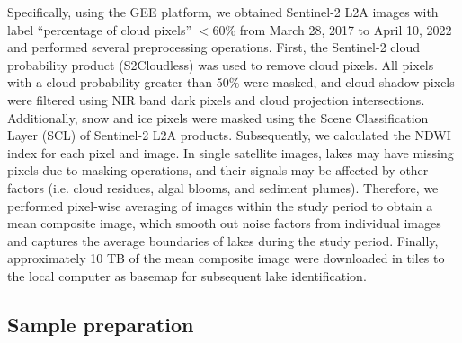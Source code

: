 \documentclass[preprint,12pt,authoryear]{elsarticle}
\begin{document}
Specifically, using the GEE platform, we obtained Sentinel-2 L2A images with label “percentage of cloud pixels” $\lt$60\% from March 28, 2017 to April 10, 2022 and performed several preprocessing operations. First, the Sentinel-2 cloud probability product (S2Cloudless) was used to remove cloud pixels. All pixels with a cloud probability greater than 50\% were masked, and cloud shadow pixels were filtered using NIR band dark pixels and cloud projection intersections. Additionally, snow and ice pixels were masked using the Scene Classification Layer (SCL) of Sentinel-2 L2A products. Subsequently, we calculated the NDWI index for each pixel and image. In single satellite images, lakes may have missing pixels due to masking operations, and their signals may be affected by other factors (i.e. cloud residues, algal blooms, and sediment plumes). Therefore, we performed pixel-wise averaging of images within the study period to obtain a mean composite image, which smooth out noise factors from individual images and captures the average boundaries of lakes during the study period. Finally, approximately 10 TB of the mean composite image were downloaded in tiles to the local computer as basemap for subsequent lake identification.

\subsection{Sample preparation}
\label{subsec2}
\end{document}
